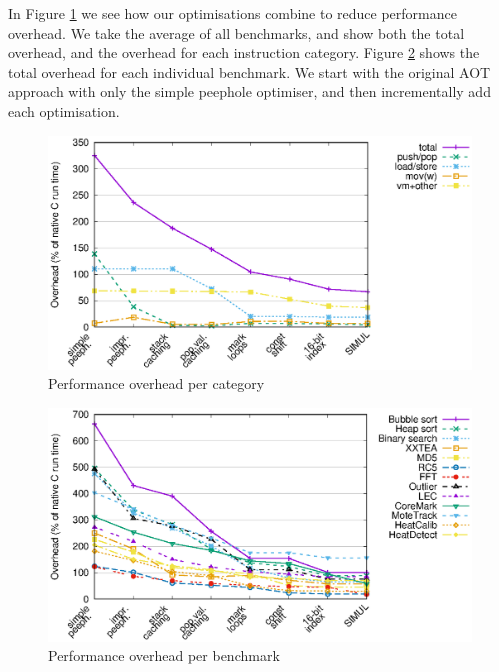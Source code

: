In Figure \ref{fig-performance-per-opcode-category} we see how our optimisations combine to reduce performance overhead. We take the average of all benchmarks, and show both the total overhead, and the overhead for each instruction category. Figure \ref{fig-performance-per-benchmark} shows the total overhead for each individual benchmark. We start with the original AOT approach with only the simple peephole optimiser, and then incrementally add each optimisation.

\begin{figure}
\centering
\includegraphics[width=\mygraphsize]{performance-per-opcode-category.eps}
\caption{Performance overhead per category}
\label{fig-performance-per-opcode-category}
\end{figure}

\begin{figure}
\centering
\includegraphics[width=\mygraphsize]{performance-per-benchmark.eps}
\caption{Performance overhead per benchmark}
\label{fig-performance-per-benchmark}
\end{figure}

